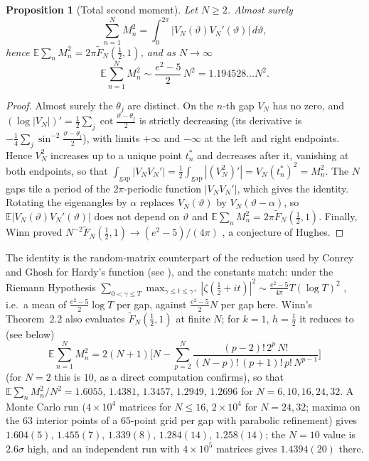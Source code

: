 \documentclass[12pt]{amsart}
\newtheorem{proposition}[theorem]{Proposition}
\theoremstyle{remark}
\newcommand{\E}{\mathbb{E}}
\newcommand{\1}{\mathbf{1}}
\begin{document}
\begin{proposition}[Total second moment]\label{prop:total}
Let $N\ge2$. Almost surely
\[
\sum_{n=1}^NM_n^2=\int_0^{2\pi}|V_N(\vartheta)V_N'(\vartheta)|\,d\vartheta ,
\]
hence $\E\sum_nM_n^2=2\pi\widetilde F_N(\frac12,1)$, and as $N\to\infty$
\[
\E\sum_{n=1}^NM_n^2\sim\frac{e^2-5}{2}\,N^2=1.194528\ldots N^2 .
\]
\end{proposition}

\begin{proof}
Almost surely the $\theta_j$ are distinct. On the $n$-th gap $V_N$ has no
zero, and $(\log|V_N|)'=\frac12\sum_j\cot\frac{\vartheta-\theta_j}2$ is
strictly decreasing (its derivative is
$-\frac14\sum_j\sin^{-2}\frac{\vartheta-\theta_j}2$), with limits $+\infty$
and $-\infty$ at the left and right endpoints. Hence $V_N^2$ increases up to
a unique point $t_n^*$ and decreases after it, vanishing at both endpoints,
so that $\int_{\mathrm{gap}}|V_NV_N'|=\frac12\int_{\mathrm{gap}}|(V_N^2)'|
=V_N(t_n^*)^2=M_n^2$. The $N$ gaps tile a period of the $2\pi$-periodic
function $|V_NV_N'|$, which gives the identity. Rotating the eigenangles by
$\alpha$ replaces $V_N(\vartheta)$ by $V_N(\vartheta-\alpha)$, so
$\E|V_N(\vartheta)V_N'(\vartheta)|$ does not depend on $\vartheta$ and
$\E\sum_nM_n^2=2\pi\widetilde F_N(\frac12,1)$. Finally, Winn proved
$N^{-2}\widetilde F_N(\frac12,1)\to(e^2-5)/(4\pi)$ \cite[(1.11), proved
in \S7]{Win12}, a conjecture of Hughes.
\end{proof}

The identity is the random-matrix counterpart of the reduction used by
Conrey and Ghosh for Hardy's function (see \cite[\S1]{Win12}), and the
constants match: under the Riemann Hypothesis
$\sum_{0<\gamma\le T}\max_{\gamma\le t\le\gamma^+}|\zeta(\frac12+it)|^2\sim
\frac{e^2-5}{4\pi}T(\log T)^2$ \cite{CG85}, i.e.\ a mean of
$\frac{e^2-5}2\log T$ per gap, against $\frac{e^2-5}2N$ per gap here.
Winn's Theorem~2.2 \cite{Win12} also evaluates $\widetilde F_N(\frac12,1)$
at finite $N$; for $k=1$, $h=\frac12$ it reduces to (see below)
\begin{equation}\label{eq:winnN}
\E\sum_{n=1}^NM_n^2=2(N+1)\Big[N-\sum_{p=2}^N\frac{(p-2)!\,2^p\,N!}
{(N-p)!\,(p+1)!\,p!\,N^{p-1}}\Big]
\end{equation}
(for $N=2$ this is $10$, as a direct computation confirms), so that
$\E\sum_nM_n^2/N^2=1.6055$, $1.4381$, $1.3457$, $1.2949$, $1.2696$ for
$N=6,10,16,24,32$. A Monte Carlo run ($4\times10^4$ matrices for $N\le16$,
$2\times10^4$ for $N=24,32$; maxima on the $63$ interior points of a
$65$-point grid per gap with parabolic refinement) gives $1.604(5)$,
$1.455(7)$, $1.339(8)$, $1.284(14)$, $1.258(14)$; the $N=10$ value is
$2.6\sigma$ high, and an independent run with $4\times10^5$ matrices gives
$1.4394(20)$ there.
\end{document}
